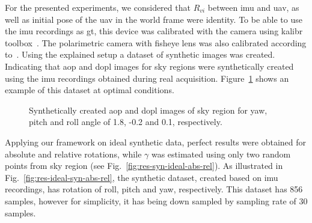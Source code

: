 For the presented experiments, we considered that $R_{vi}$ between \gls{imu}
and \gls{uav}, as well as initial pose of the \gls{uav} in the world frame were
identity.  To be able to use the \gls{imu} recordings as \gls{gt}, this device
was calibrated with the camera using kalibr toolbox~\cite{furgale2013unified,
  furgale2012continuous}. The polarimetric camera with fisheye lens was also
calibrated according to~\cite{kannala2006generic}.  Using the explained setup a
dataset of synthetic images was created.
Indicating that \gls{aop} and \gls{dopl} images for sky regions were
synthetically created using the \gls{imu} recordings obtained during real
acquisition. Figure~\ref{fig:aop-dop-syn} shows an example of this dataset at
optimal conditions.
\begin{figure}
    \centering
    \hfill
    \label{fig:aop-syn}
    \label{fig:dop-syn}
    \hspace*{\fill}
    \caption{Synthetically created \gls{aop} and \gls{dopl} images of sky
      region for yaw, pitch and roll angle of 1.8, -0.2 and 0.1, respectively.}
    \label{fig:aop-dop-syn}
\end{figure}

Applying our framework on ideal synthetic data, perfect results were obtained
for absolute and relative rotations, while $\gamma$ was estimated using only
two random points from sky region (see Fig.~\ref{fig:res-syn-ideal-abs-rel}).
As illustrated in Fig.~\ref{fig:res-ideal-syn-abs-rel}, the synthetic dataset,
created based on \gls{imu} recordings, has rotation of roll, pitch and yaw,
respectively. This dataset has 856 samples, however for simplicity, it has
being down sampled by sampling rate of 30 samples.

